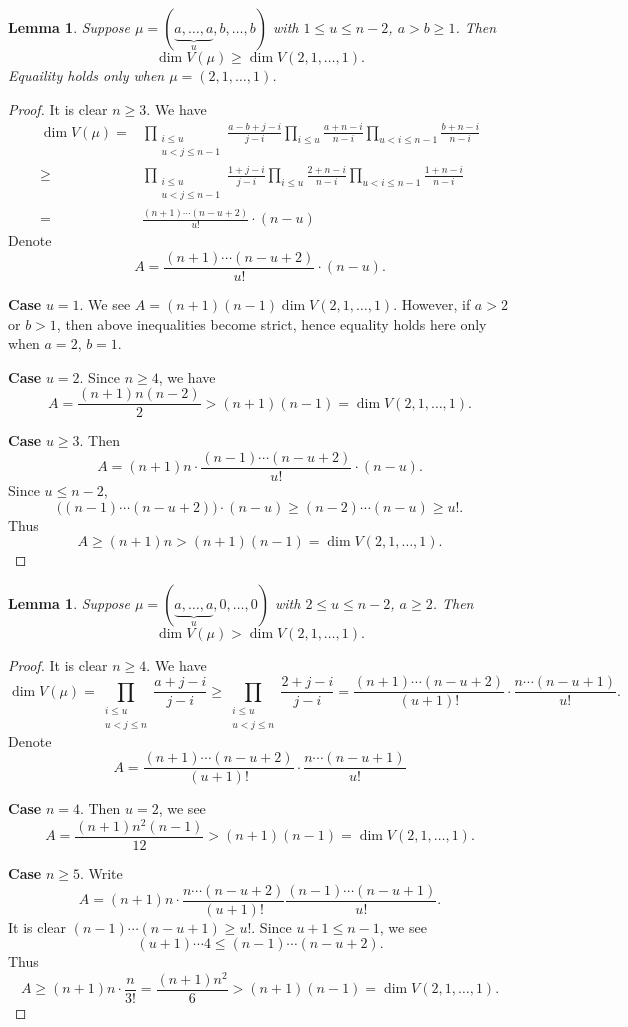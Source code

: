 \documentclass[a4paper]{amsart}
\theoremstyle{plain}
\newtheorem{lem}[thm]{Lemma}
\theoremstyle{remark} \newtheorem{remark}[thm]{Remark}
\theoremstyle{remark} \newtheorem{exercise}{Exercise}
\theoremstyle{remark} \newtheorem{example}{Example}
\numberwithin{equation}{section}
\begin{document}
\begin{lem}\label{uni-ineq2}
    Suppose $\mu=(\underbrace{a,\ldots,a}_u,b,\ldots,b)$ with $1\leqslant u\leqslant n-2$, $a>b\geqslant 1$. Then
    \[\dim V(\mu)\geqslant \dim V(2,1,\ldots,1).\]
    Equaility holds only when $\mu=(2,1,\ldots,1)$.
\end{lem}
\begin{proof}
    It is clear $n\geqslant 3$. We have
    \begin{align*}
        \dim V(\mu)=&\prod_{\substack{i\leqslant u\\ u<j\leqslant n-1}}\frac{a-b+j-i}{j-i}\prod_{i\leqslant u}\frac{a+n-i}{n-i}\prod_{u<i\leqslant n-1}\frac{b+n-i}{n-i}\\
        \geqslant &\prod_{\substack{i\leqslant u\\ u<j\leqslant n-1}}\frac{1+j-i}{j-i}\prod_{i\leqslant u}\frac{2+n-i}{n-i}\prod_{u<i\leqslant n-1}\frac{1+n-i}{n-i}\\
        =&\frac{(n+1)\cdots(n-u+2)}{u!}\cdot (n-u)
    \end{align*}
    Denote
    \[A=\frac{(n+1)\cdots(n-u+2)}{u!}\cdot (n-u).\]
    
    \textbf{Case }$u=1$. We see $A=(n+1)(n-1)\dim V(2,1,\ldots,1)$. However, if $a>2$ or $b>1$, then above inequalities become strict, hence equality holds here only when $a=2$, $b=1$.

    \textbf{Case }$u=2$. Since $n\geqslant 4$, we have
    \[A=\frac{(n+1)n(n-2)}{2}>(n+1)(n-1)=\dim V(2,1,\ldots,1).\]

    \textbf{Case }$u\geqslant 3$. Then
    \[A=(n+1)n\cdot\frac{(n-1)\cdots(n-u+2)}{u!}\cdot(n-u).\]
    Since $u\leqslant n-2$,
    \[\big((n-1)\cdots(n-u+2)\big)\cdot (n-u)\geqslant (n-2)\cdots(n-u)\geqslant u!.\]
    Thus
    \[A\geqslant (n+1)n>(n+1)(n-1)=\dim V(2,1,\ldots,1).\]
\end{proof}

\begin{lem}\label{uni-ineq3}
    Suppose $\mu=(\underbrace{a,\ldots,a}_u,0,\ldots,0)$ with $2\leqslant u\leqslant n-2$, $a\geqslant 2$. Then
    \[\dim V(\mu)>\dim V(2,1,\ldots,1).\]
\end{lem}
\begin{proof}
    It is clear $n\geqslant 4$. We have
    \[\dim V(\mu)=\prod_{\substack{i\leqslant u\\ u<j\leqslant n}}\frac{a+j-i}{j-i}\geqslant \prod_{\substack{i\leqslant u\\ u<j\leqslant n}}\frac{2+j-i}{j-i}=\frac{(n+1)\cdots(n-u+2)}{(u+1)!}\cdot\frac{n\cdots (n-u+1)}{u!}.\]
    Denote
    \[A=\frac{(n+1)\cdots(n-u+2)}{(u+1)!}\cdot\frac{n\cdots (n-u+1)}{u!}\]

    \textbf{Case }$n=4$. Then $u=2$, we see
    \[A=\frac{(n+1)n^2(n-1)}{12}>(n+1)(n-1)=\dim V(2,1,\ldots,1).\]

    \textbf{Case }$n\geqslant 5$. Write
    \[A=(n+1)n\cdot\frac{n\cdots(n-u+2)}{(u+1)!}\frac{(n-1)\cdots(n-u+1)}{u!}.\]
    It is clear $(n-1)\cdots (n-u+1)\geqslant u!$. Since $u+1\leqslant n-1$, we see
    \[(u+1)\cdots 4\leqslant (n-1)\cdots (n-u+2).\]
    Thus
    \[A\geqslant (n+1)n\cdot\frac{n}{3!}=\frac{(n+1)n^2}{6}>(n+1)(n-1)=\dim V(2,1,\ldots,1).\]
\end{proof}
\end{document}
